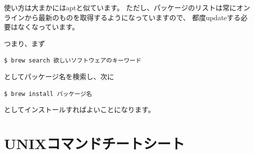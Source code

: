 \documentclass[a4j]{ltjreport}
\begin{document}
    使い方は大まかにはaptと似ています。
    ただし、パッケージのリストは常にオンラインから最新のものを取得するようになっていますので、
    都度updateする必要はなくなっています。

    つまり、まず
    \begin{screen}
        \texttt{\$ brew search 欲しいソフトウェアのキーワード}
    \end{screen}
    としてパッケージ名を検索し、次に
    \begin{screen}
        \texttt{\$ brew install パッケージ名}
    \end{screen}
    としてインストールすればよいことになります。



    \section{UNIXコマンドチートシート}
\end{document}
